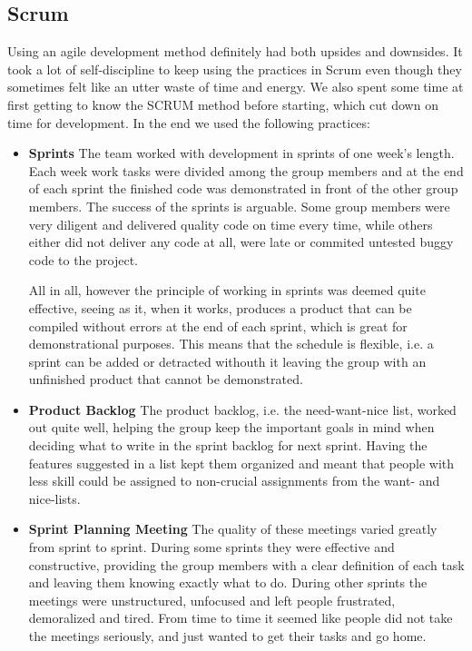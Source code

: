\subsection{Scrum}
Using an agile development method definitely had both upsides and downsides. It took a lot of self-discipline to keep using the practices in Scrum even though they sometimes felt like an utter waste of time and energy. We also spent some time at first getting to know the SCRUM method before starting, which cut down on time for development.
In the end we used the following practices:
\begin{itemize}
	\item \textbf{Sprints} The team worked with development in sprints of one week's length. Each week work tasks were divided
	among the group members and at the end of each sprint the finished code was demonstrated in front of the other group
	members. The success of the sprints is arguable. Some group members were very diligent and delivered quality code on time
	every time, while others either did not deliver any code at all, were late or commited untested buggy code to the project.
	
	All in all, however the principle of working in sprints was deemed quite effective, seeing as it, when it works, produces a
	product that can be compiled without errors at the end of each sprint, which is great for demonstrational purposes. This
	means that the schedule is flexible, i.e. a sprint can be added or detracted withouth it leaving the group with an
	unfinished product that cannot be demonstrated.
	
	\item \textbf{Product Backlog} The product backlog, i.e. the need-want-nice list, worked out quite well, helping the group
	keep the important goals in mind when deciding what to write in the sprint backlog for next sprint. Having the features
	suggested in a list kept them organized and meant that people with less skill could be assigned to non-crucial
	assignments from the want- and nice-lists.
	
	\item \textbf{Sprint Planning Meeting} The quality of these meetings varied greatly from sprint to sprint. During some
	sprints they were effective and constructive, providing the group members with a clear definition of each task and leaving
	them knowing exactly what to do. During other sprints the meetings were unstructured, unfocused and left people frustrated,
	demoralized and tired. From time to time it seemed like people did not take the meetings seriously, and just wanted to get
	their tasks and go home.
	

\end{itemize}
